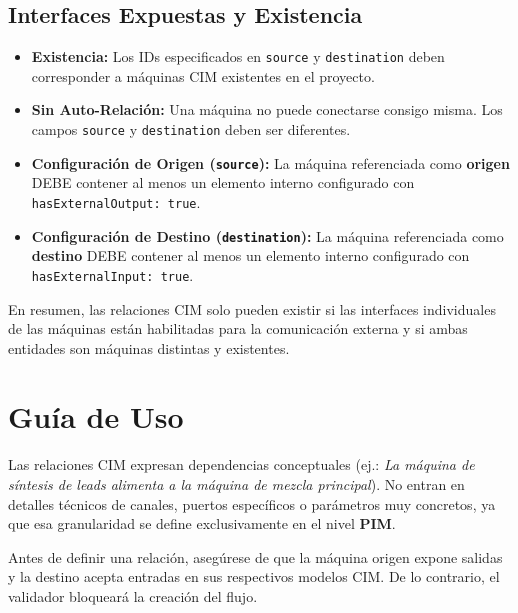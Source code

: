\subsection{Interfaces Expuestas y Existencia}
\begin{itemize}
    \item \textbf{Existencia:} Los IDs especificados en \texttt{source} y \texttt{destination} deben corresponder a máquinas CIM existentes en el proyecto.
    \item \textbf{Sin Auto-Relación:} Una máquina no puede conectarse consigo misma. Los campos \texttt{source} y \texttt{destination} deben ser diferentes.
    \item \textbf{Configuración de Origen (\texttt{source}):} La máquina referenciada como \textbf{origen} DEBE contener al menos un elemento interno configurado con \texttt{hasExternalOutput: true}.
    \item \textbf{Configuración de Destino (\texttt{destination}):} La máquina referenciada como \textbf{destino} DEBE contener al menos un elemento interno configurado con \texttt{hasExternalInput: true}.
\end{itemize}

En resumen, las relaciones CIM solo pueden existir si las interfaces individuales de las máquinas están habilitadas para la comunicación externa y si ambas entidades son máquinas distintas y existentes.

\section{Guía de Uso}

Las relaciones CIM expresan dependencias conceptuales (ej.: \textit{La máquina de síntesis de leads alimenta a la máquina de mezcla principal}). No entran en detalles técnicos de canales, puertos específicos o parámetros muy concretos, ya que esa granularidad se define exclusivamente en el nivel \textbf{PIM}.

\begin{tcolorbox}[colback=blue!5!white,colframe=blue!75!black,title=CONSEJO]
Antes de definir una relación, asegúrese de que la máquina origen expone salidas y la destino acepta entradas en sus respectivos modelos CIM. De lo contrario, el validador bloqueará la creación del flujo.
\end{tcolorbox}
